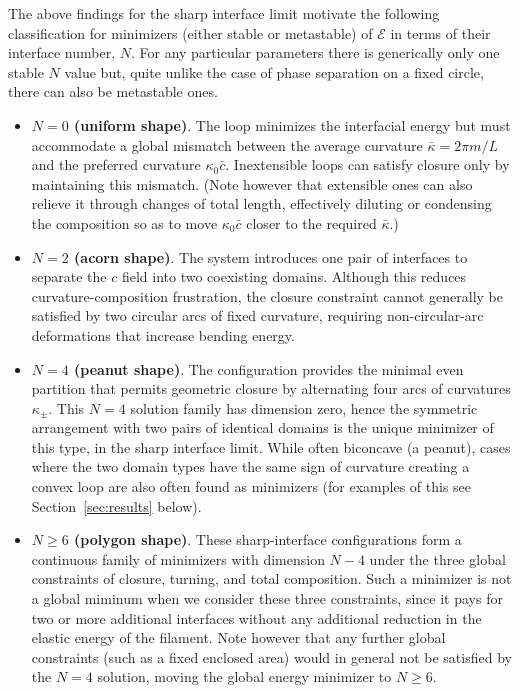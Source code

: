 \documentclass[
aip,
jcp,
reprint, 
floatfix
]{revtex4-1}
\begin{document}
The above findings for the sharp interface limit motivate the following classification for minimizers (either stable or metastable) of $\mathcal{E}$ in terms of their interface number, $N$. For any particular parameters there is generically only one stable $N$ value but, quite unlike the case of phase separation on a fixed circle, there can also be metastable ones.
\begin{itemize}
    \item \textbf{$N=0$ (uniform shape)}. The loop minimizes the interfacial energy but must accommodate a global mismatch between the average curvature $\bar{\kappa}=2 \pi m / L$ and the preferred curvature $\kappa_0 \bar{c}$.
Inextensible loops can satisfy closure only by maintaining this mismatch. (Note however that extensible ones can also relieve it through changes of total length, effectively diluting or condensing the composition so as to move $\kappa_0\bar c$ closer to the required $\bar \kappa$.) 
\item \textbf{$N=2$ (acorn shape)}. The system introduces one pair of interfaces to separate the $c$ field into two coexisting domains. Although this reduces curvature-composition frustration, the closure constraint cannot generally be satisfied by two circular arcs of fixed curvature, requiring non-circular-arc deformations that increase bending energy.
\item  \textbf{$N=4$ (peanut shape)}. The configuration provides the minimal even partition that permits geometric closure by alternating four arcs of curvatures $\kappa_{ \pm}$. This $N=4$ solution family has dimension zero, hence the symmetric arrangement with two pairs of identical domains is the unique minimizer of this type, in the sharp interface limit. While often biconcave (a peanut), cases where the two domain types have the same sign of curvature creating a convex loop are also often found as minimizers (for examples of this see Section~\ref{sec:results} below).
\item \textbf{$N \geq 6$ (polygon shape)}. These sharp-interface configurations form a continuous family of minimizers with dimension $N-4$ under the three global constraints of closure, turning, and total composition. Such a minimizer is not a global miminum when we consider these three constraints, since it pays for two or more additional interfaces without any additional reduction in the elastic energy of the filament. Note however that any  further global constraints (such as a fixed enclosed area) would in general not be satisfied by the $N=4$ solution, moving the global energy minimizer to $N\ge 6$.
\end{itemize}
\end{document}
